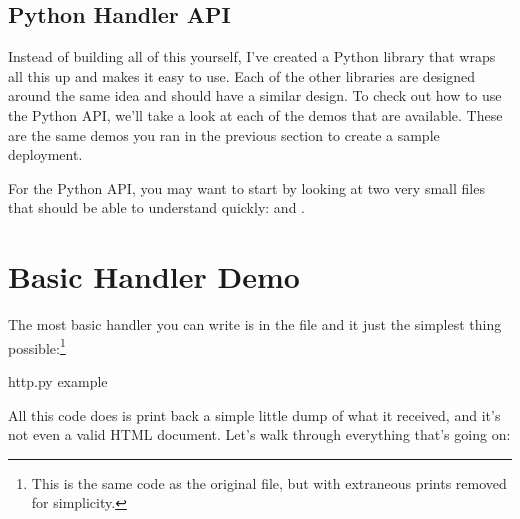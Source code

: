 \subsection{Python Handler API}

Instead of building all of this yourself, I've created a Python library
that wraps all this up and makes it easy to use.  Each of the other
libraries are designed around the same idea and should have a similar
design.  To check out how to use the Python API, we'll take a look at
each of the demos that are available.  These are the same demos you
ran in the previous section to create a sample deployment.

For the Python API, you may want to start by looking at two very small files that should be able to understand quickly:
 and
.


\section{Basic Handler Demo}

The most basic handler you can write is in the  file
and it just the simplest thing possible:\footnote{This is the same code as the original
file, but with extraneous prints removed for simplicity.}

\begin{code}{http.py example}
  
\end{code}

All this code does is print back a simple little dump of what it received, and
it's not even a valid HTML document.  Let's walk through everything that's going on:


